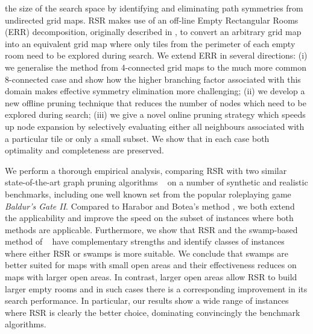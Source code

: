 the size of the search space by identifying and eliminating path symmetries from
undirected grid maps.
RSR makes use of an off-line Empty Rectangular Rooms (ERR) decomposition, originally described in
\cite{harabor10}, to convert an arbitrary grid map into an equivalent grid map where only tiles from the 
perimeter of each empty room need to be explored during search.
We extend ERR in several directions: (i) we generalise the method from 4-connected grid maps to 
the much more common 8-connected case and show how the higher branching factor associated 
with this domain makes effective symmetry elimination more challenging;
(ii) we develop a new offline pruning technique that reduces the number of nodes which
need to be explored during search;
(iii) we give a novel online pruning strategy which speeds up node expansion by selectively 
evaluating either all neighbours associated with a particular tile or only a small subset.
We show that in each case both optimality and completeness are preserved.
\par
We perform a thorough empirical analysis, comparing RSR with two similar
state-of-the-art graph pruning algorithms ~\cite{pochter10,harabor10}
on a number of synthetic and realistic benchmarks, including one well known set 
from the popular roleplaying game \emph{Baldur's Gate II}.
Compared to Harabor and Botea's method , 
we both extend the applicability and improve the speed
on the subset of instances where both methods are applicable.
Furthermore, we show that RSR and the swamp-based method of 
\citeauthor{pochter10}~
have complementary strengths and identify classes of instances where
either RSR or swamps is more suitable.
We conclude that swamps are better suited for maps with
small open areas and their effectiveness reduces on maps with larger open areas.
In contrast, larger open areas allow RSR to build larger empty rooms and in such
cases there is a corresponding improvement in its search performance.
In particular, our results show a wide range of instances where
RSR is clearly the better choice, dominating convincingly the benchmark algorithms.

